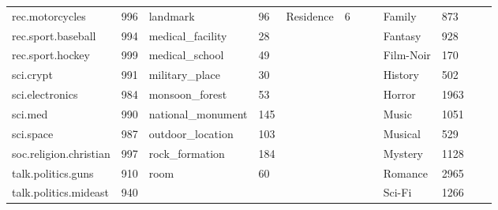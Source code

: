 \begin{landscape}
\begin{table}[]
\begin{tabular}{llllllllllll}
		rec.motorcycles                   & 996       & landmark                     & 96        & Residence                  & 6         &                              &           & Family                    & 873       &              &           \\
		rec.sport.baseball                & 994       & medical\_facility             & 28        &                            &           &                              &           & Fantasy                   & 928       &              &           \\
		rec.sport.hockey                  & 999       & medical\_school               & 49        &                            &           &                              &           & Film-Noir                 & 170       &              &           \\
		sci.crypt                         & 991       & military\_place               & 30        &                            &           &                              &           & History                   & 502       &              &           \\
		sci.electronics                   & 984       & monsoon\_forest               & 53        &                            &           &                              &           & Horror                    & 1963      &              &           \\
		sci.med                           & 990       & national\_monument            & 145       &                            &           &                              &           & Music                     & 1051      &              &           \\
		sci.space                         & 987       & outdoor\_location             & 103       &                            &           &                              &           & Musical                   & 529       &              &           \\
		soc.religion.christian            & 997       & rock\_formation               & 184       &                            &           &                              &           & Mystery                   & 1128      &              &           \\
		talk.politics.guns                & 910       & room                         & 60        &                            &           &                              &           & Romance                   & 2965      &              &           \\
		talk.politics.mideast             & 940       &                              &           &                            &           &                              &           & Sci-Fi                    & 1266      &              &           \\

\end{tabular}
\end{table}
\end{landscape}
